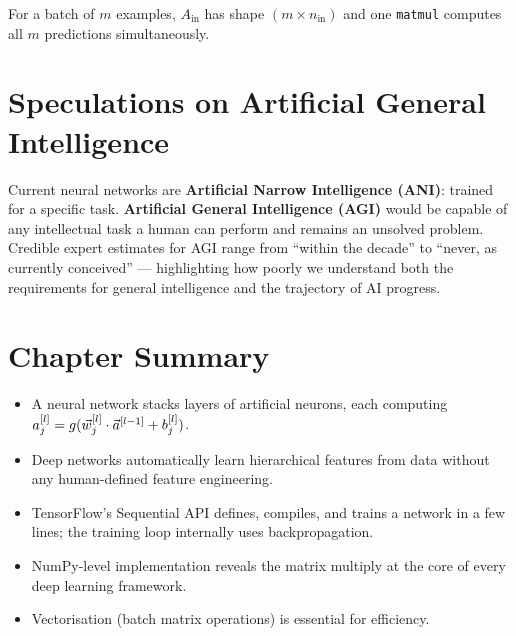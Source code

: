 For a batch of $m$ examples, $A_{\text{in}}$ has shape $(m\times n_{\text{in}})$
and one \texttt{matmul} computes all $m$ predictions simultaneously.

\section{Speculations on Artificial General Intelligence}

Current neural networks are \textbf{Artificial Narrow Intelligence (ANI)}:
trained for a specific task. \textbf{Artificial General Intelligence (AGI)}
would be capable of any intellectual task a human can perform and remains an
unsolved problem. Credible expert estimates for AGI range from ``within the
decade'' to ``never, as currently conceived'' — highlighting how poorly we
understand both the requirements for general intelligence and the trajectory of
AI progress.

\section*{Chapter Summary}

\begin{itemize}
\item A neural network stacks layers of artificial neurons, each computing
  $a_j^{[l]}=g(\vec{w}_j^{[l]}\cdot\vec{a}^{[l-1]}+b_j^{[l]})$.
\item Deep networks automatically learn hierarchical features from data without
  any human-defined feature engineering.
\item TensorFlow's Sequential API defines, compiles, and trains a network in a
  few lines; the training loop internally uses backpropagation.
\item NumPy-level implementation reveals the matrix multiply at the core of
  every deep learning framework.
\item Vectorisation (batch matrix operations) is essential for efficiency.
\end{itemize}
